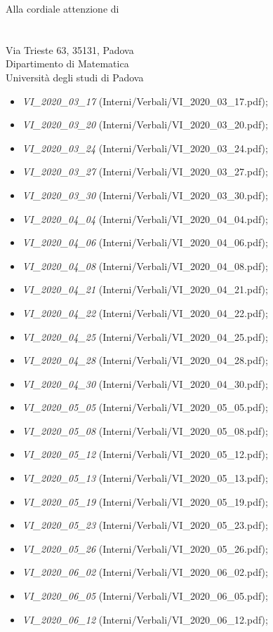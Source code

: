 \documentclass[a4paper]{letter}
\begin{document}
\begin{letter} {Alla cordiale attenzione di \\ \TV \\ \RC \\ Via Trieste 63, 35131, Padova\\ Dipartimento di Matematica \\ Università degli studi di Padova }
\begin{itemize}
\begin{itemize}
				\item \textit{VI\_2020\_03\_17} (Interni/Verbali/VI\_2020\_03\_17.pdf);
				\item \textit{VI\_2020\_03\_20} (Interni/Verbali/VI\_2020\_03\_20.pdf);
				\item \textit{VI\_2020\_03\_24} (Interni/Verbali/VI\_2020\_03\_24.pdf);
				\item \textit{VI\_2020\_03\_27} (Interni/Verbali/VI\_2020\_03\_27.pdf);
				\item \textit{VI\_2020\_03\_30} (Interni/Verbali/VI\_2020\_03\_30.pdf);
				\item \textit{VI\_2020\_04\_04} (Interni/Verbali/VI\_2020\_04\_04.pdf);
				\item \textit{VI\_2020\_04\_06} (Interni/Verbali/VI\_2020\_04\_06.pdf);
				\item \textit{VI\_2020\_04\_08} (Interni/Verbali/VI\_2020\_04\_08.pdf);
				\item \textit{VI\_2020\_04\_21} (Interni/Verbali/VI\_2020\_04\_21.pdf);
				\item \textit{VI\_2020\_04\_22} (Interni/Verbali/VI\_2020\_04\_22.pdf);
				\item \textit{VI\_2020\_04\_25} (Interni/Verbali/VI\_2020\_04\_25.pdf);
				\item \textit{VI\_2020\_04\_28} (Interni/Verbali/VI\_2020\_04\_28.pdf);
				\item \textit{VI\_2020\_04\_30} (Interni/Verbali/VI\_2020\_04\_30.pdf);
				\item \textit{VI\_2020\_05\_05} (Interni/Verbali/VI\_2020\_05\_05.pdf);
				\item \textit{VI\_2020\_05\_08} (Interni/Verbali/VI\_2020\_05\_08.pdf);
				\item \textit{VI\_2020\_05\_12} (Interni/Verbali/VI\_2020\_05\_12.pdf);
				\item \textit{VI\_2020\_05\_13} (Interni/Verbali/VI\_2020\_05\_13.pdf);
				\item \textit{VI\_2020\_05\_19} (Interni/Verbali/VI\_2020\_05\_19.pdf);
				\item \textit{VI\_2020\_05\_23} (Interni/Verbali/VI\_2020\_05\_23.pdf);
				\item \textit{VI\_2020\_05\_26} (Interni/Verbali/VI\_2020\_05\_26.pdf);
				\item \textit{VI\_2020\_06\_02} (Interni/Verbali/VI\_2020\_06\_02.pdf);
				\item \textit{VI\_2020\_06\_05} (Interni/Verbali/VI\_2020\_06\_05.pdf);
				\item \textit{VI\_2020\_06\_12} (Interni/Verbali/VI\_2020\_06\_12.pdf);

\end{itemize}
\end{itemize}
\end{letter}
\end{document}
